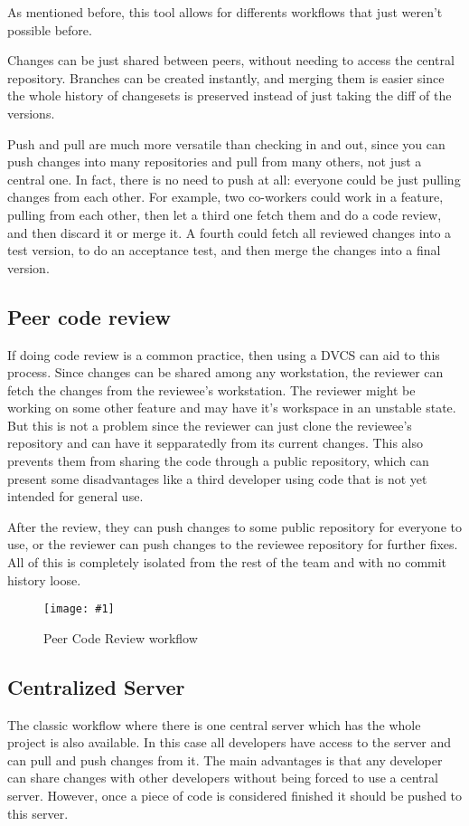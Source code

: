 \documentclass[a4paper,10pt]{article}
\newcommand{\diagrama}[2]{
    \begin{figure}[h]
        \begin{center}
            \texttt{[image: \#1]} 
        \end{center}
        \caption{#2}
    \end{figure}
}
\begin{document}
As mentioned before, this tool allows for differents workflows that just weren't 
possible before.

Changes can be just shared between peers, without needing to access the central 
repository. Branches can be created instantly, and merging them is easier since 
the whole history of changesets is preserved instead of just taking the diff of 
the versions.

Push and pull are much more versatile than checking in and out, since you can push 
changes into many repositories and pull from many others, not just a central one.
In fact, there is no need to push at all:
everyone could be just pulling changes from each other. For example, two co-workers could work 
in a feature, pulling from each other, then let a third one fetch them and do a code review, and then 
discard it or merge it. A fourth could fetch all reviewed changes into a test version, to do an 
acceptance test, and then merge the changes into a final version.

\subsection{Peer code review}
If doing code review is a common practice, then using a DVCS can aid to this process. Since changes can be shared
among any workstation, the reviewer can fetch the changes from the reviewee's workstation. The reviewer might be
working on some other feature and may have it's workspace in an unstable state. But this is not a problem since the
reviewer can just clone the reviewee's repository and can have it sepparatedly from its current changes.
This also prevents them from sharing the code through a public repository, which can present some disadvantages like
a third developer using code that is not yet intended for general use.

After the review, they can push changes to some public repository for everyone to use, or the reviewer can push changes to the reviewee repository for further fixes. All of this is completely isolated from the rest of the team and with no commit history loose.

\diagrama{PeerCodeReview.jpg}{Peer Code Review workflow}

\subsection{Centralized Server}
The classic workflow where there is one central server which has the whole project is also available. In this case all developers have access to the server and can pull and push changes from it. The main advantages is that any developer can share changes with other developers without being forced to use a central server. However, once a piece of code is considered finished it should be pushed to this server.
\end{document}
